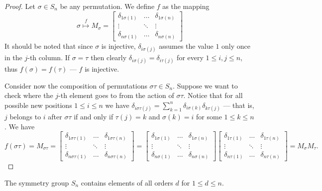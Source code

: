 \begin{proof}
  Let \(\sigma \in S_n\) be any permutation. We define \(f\) as the
  mapping
  \[
    \sigma \overset f \longmapsto M_\sigma =
    \begin{bmatrix}
      \delta_{1 \sigma(1)} &\dots &\delta_{1 \sigma(n)} \\
      \vdots &\ddots &\vdots \\
      \delta_{n \sigma(1)} &\dots &\delta_{n \sigma(n)}
    \end{bmatrix}
  \]
  It should be noted that since \(\sigma\) is injective, \(\delta_{i
  \sigma(j)}\) assumes the value \(1\) only once in the \(j\)-th column. If
  \(\sigma = \tau\) then clearly \(\delta_{i \sigma(j)} = \delta_{i \tau(j)}\)
  for every \(1 \leq i, j \leq n\), thus \(f(\sigma) = f(\tau)\) --- \(f\) is
  injective.

  Consider now the composition of permutations \(\sigma \tau \in S_n\).
  Suppose we want to check where the \(j\)-th element goes to from the action of
  \(\sigma \tau\). Notice that for all possible new positions \(1 \leq i \leq
  n\) we have \(\delta_{i \sigma\tau(j)} = \sum_{k = 1}^n \delta_{i \sigma(k)}
  \delta_{k \tau(j)}\) --- that is, \(j\) belongs to \(i\) after \(\sigma \tau\)
  if and only if \(\tau(j) = k\) and \(\sigma(k) = i\) for some \(1 \leq k \leq
  n\). We have
  \[
    f(\sigma \tau) = M_{\sigma \tau} =
    \begin{bmatrix}
      \delta_{1 \sigma\tau(1)} &\dots &\delta_{1 \sigma\tau(n)} \\
      \vdots &\ddots &\vdots \\
      \delta_{n \sigma\tau(1)} &\dots &\delta_{n \sigma\tau(n)}
    \end{bmatrix}
    =
    \begin{bmatrix}
      \delta_{1 \sigma(1)} &\dots &\delta_{1 \sigma(n)} \\
      \vdots &\ddots &\vdots \\
      \delta_{n \sigma(1)} &\dots &\delta_{n \sigma(n)}
    \end{bmatrix}
    \begin{bmatrix}
      \delta_{1 \tau(1)} &\dots &\delta_{1 \tau(n)} \\
      \vdots &\ddots &\vdots \\
      \delta_{n \tau(1)} &\dots &\delta_{n \tau(n)}
    \end{bmatrix}
    = M_\sigma M_\tau.
  \]
\end{proof}

\begin{proposition}\label{prop: sym-n-all-orders}
  The symmetry group \(S_n\) contains elements of all orders \(d\) for
  \(1 \leq d \leq n\).
\end{proposition}

